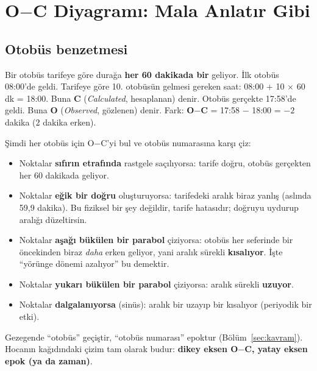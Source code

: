 \section{O$-$C Diyagramı: Mala Anlatır Gibi}
\label{sec:oc}

\subsection{Otobüs benzetmesi}
Bir otobüs tarifeye göre durağa \textbf{her 60 dakikada bir} geliyor. İlk otobüs 08:00'de geldi.
Tarifeye göre 10. otobüsün gelmesi gereken saat: 08:00 + 10 $\times$ 60 dk = 18:00. Buna \textbf{C}
(\emph{Calculated}, hesaplanan) denir. Otobüs gerçekte 17:58'de geldi. Buna \textbf{O} (\emph{Observed}, gözlenen)
denir. Fark: \textbf{O$-$C} = 17:58 $-$ 18:00 = $-2$ dakika (2 dakika erken).

Şimdi her otobüs için O$-$C'yi bul ve otobüs numarasına karşı çiz:
\begin{itemize}[leftmargin=*]
\item Noktalar \textbf{sıfırın etrafında} rastgele saçılıyorsa: tarife doğru, otobüs gerçekten her 60 dakikada geliyor.
\item Noktalar \textbf{eğik bir doğru} oluşturuyorsa: tarifedeki aralık biraz yanlış (aslında 59,9 dakika). Bu fiziksel
      bir şey değildir, tarife hatasıdır; doğruyu uydurup aralığı düzeltirsin.
\item Noktalar \textbf{aşağı bükülen bir parabol} çiziyorsa: otobüs her seferinde bir öncekinden biraz \emph{daha} erken
      geliyor, yani aralık sürekli \textbf{kısalıyor}. İşte “yörünge dönemi azalıyor” bu demektir.
\item Noktalar \textbf{yukarı bükülen bir parabol} çiziyorsa: aralık sürekli \textbf{uzuyor}.
\item Noktalar \textbf{dalgalanıyorsa} (sinüs): aralık bir uzayıp bir kısalıyor (periyodik bir etki).
\end{itemize}
Gezegende “otobüs” geçiştir, “otobüs numarası” epoktur (Bölüm~\ref{sec:kavram}). Hocanın kağıdındaki çizim
tam olarak budur: \textbf{dikey eksen O$-$C, yatay eksen epok (ya da zaman)}.

